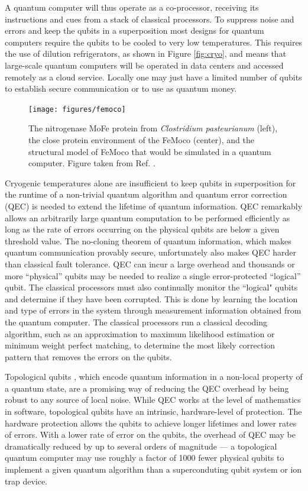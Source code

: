 \documentclass[journal]{IEEEtran}
\begin{document}
A quantum computer will thus operate as a co-processor, receiving its instructions and cues from a stack of classical processors. To suppress noise and errors and keep the qubits in a superposition most designs for quantum computers require the qubits to be cooled to very low temperatures. This requires the use of dilution refrigerators, as shown in Figure \ref{fig:cryo}, and means that large-scale quantum computers will be operated in data centers and accessed remotely as a cloud service. Locally one may just have a limited number of qubits to establish secure communication or to use as quantum money.

\begin{figure}[tb]
\centering
\texttt{[image: figures/femoco]}
\caption{The nitrogenase MoFe protein from {\it Clostridium pasteurianum} (left), the close protein environment of the FeMoco (center), and the structural model of FeMoco that would be simulated in a quantum computer. Figure taken from Ref. \cite{nitrogenase}.}
\label{fig:femoco}
\end{figure}


Cryogenic temperatures alone are insufficient to keep qubits in superposition for the runtime of a non-trivial quantum algorithm and quantum error correction (QEC) \cite{qec} is needed to extend the lifetime of quantum information.  QEC remarkably allows an arbitrarily large quantum computation to be performed efficiently as long as the rate of errors occurring on the physical qubits are below a given threshold value. The no-cloning theorem of quantum information, which makes quantum communication provably secure, unfortunately also makes QEC harder than classical fault tolerance. QEC can incur a large overhead and thousands or more ``physical'' qubits may be needed to realize a single error-protected ``logical'' qubit. The classical processors must also continually monitor the ``logical" qubits and determine if they have been corrupted.  This is done by learning the location and type of errors in the system through measurement information obtained from the quantum computer.  The classical processors run a classical decoding algorithm, such as an approximation to maximum likelihood estimation or minimum weight perfect matching, to determine the most likely correction pattern that removes the errors on the qubits. 

Topological qubits \cite{tqc}, which  encode  quantum information in a non-local property of a quantum state, are a promising way of reducing the QEC overhead by being robust to any source of local noise.  While QEC works at the level of mathematics in software, topological qubits have an intrinsic, hardware-level of protection.  The hardware protection allows the qubits to achieve longer lifetimes and lower rates of errors.  With a lower rate of error on the qubits, the overhead of QEC may be dramatically reduced by up to several orders of magnitude --- a topological quantum computer may use roughly a factor of 1000 fewer physical qubits to implement a given quantum algorithm than a superconduting qubit system or ion trap device.
\end{document}
